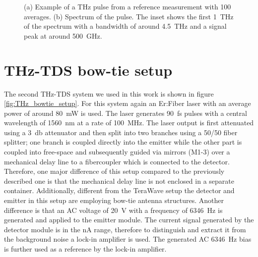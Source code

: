 \begin{figure}[H]
\begin{subfigure}[b]{.5\linewidth}
    \end{subfigure}
    \caption{(a) Example of a THz pulse from a reference measurement with 100 averages. (b) Spectrum of the pulse. The inset shows the first \SI{1}{\tera \hertz} of the spectrum with a bandwidth of around \SI{4.5}{\tera \hertz} and a signal peak at around \SI{500}{\giga \hertz}.}
    \label{fig:HHI_pulse_example}
\end{figure}


\section{THz-TDS bow-tie setup}
\label{sec:bow_tie_setup}
The second THz-TDS system we used in this work is shown in figure \ref{fig:THz_bowtie_setup}. For this system again an Er:Fiber laser with an average power of around \SI{80}{\milli \watt} is used. The laser generates \SI{90}{\femto \second} pulses with a central wavelength of \SI{1560}{\nano \meter} at a rate of \SI{100}{\mega \hertz}. The laser output is first attenuated using a \SI{3}{\decibel} attenuator and then split into two branches using a 50/50 fiber splitter; one branch is coupled directly into the emitter while the other part is coupled into free-space and subsequently guided via mirrors (M1-3) over a mechanical delay line to a fibercoupler which is connected to the detector. Therefore, one major difference of this setup compared to the previously described one is that the mechanical delay line is not enclosed in a separate container. Additionally, different from the TeraWave setup the detector and emitter in this setup are employing bow-tie antenna structures. Another difference is that an AC voltage of \SI{20}{\volt} with a frequency of \SI{6346}{\hertz} is generated and applied to the emitter module. The current signal generated by the detector module is in the \si{\nano \ampere} range, therefore to distinguish and extract it from the background noise a lock-in amplifier is used. The generated AC \SI{6346}{\hertz} bias is further used as a reference by the lock-in amplifier.

